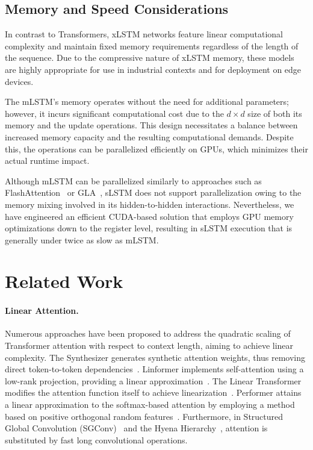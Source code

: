 \subsection{Memory and Speed Considerations}

In contrast to Transformers, xLSTM networks feature linear computational complexity and maintain fixed memory requirements regardless of the length of the sequence. Due to the compressive nature of xLSTM memory, these models are highly appropriate for use in industrial contexts and for deployment on edge devices.

The mLSTM's memory operates without the need for additional parameters; however, it incurs significant computational cost due to the $d \times d$ size of both its memory and the update operations. This design necessitates a balance between increased memory capacity and the resulting computational demands. Despite this, the operations can be parallelized efficiently on GPUs, which minimizes their actual runtime impact.

Although mLSTM can be parallelized similarly to approaches such as FlashAttention~\citep{Dao:22,Dao:23} or GLA~\citep{Yang:23arxiv}, sLSTM does not support parallelization owing to the memory mixing involved in its hidden-to-hidden interactions. Nevertheless, we have engineered an efficient CUDA-based solution that employs GPU memory optimizations down to the register level, resulting in sLSTM execution that is generally under twice as slow as mLSTM.

\section{Related Work}
\label{sec:related}

\paragraph{Linear Attention.} Numerous approaches have been proposed to address the quadratic scaling of Transformer attention with respect to context length, aiming to achieve linear complexity. The Synthesizer generates synthetic attention weights, thus removing direct token-to-token dependencies~\citep{Tay:20arxiv}. Linformer implements self-attention using a low-rank projection, providing a linear approximation~\citep{Wang:20arxiv}. The Linear Transformer modifies the attention function itself to achieve linearization~\citep{Katharopoulos:20}. Performer attains a linear approximation to the softmax-based attention by employing a method based on positive orthogonal random features~\citep{Choromanski:21}. Furthermore, in Structured Global Convolution (SGConv)~\citep{Li:22} and the Hyena Hierarchy~\citep{Poli:23}, attention is substituted by fast long convolutional operations.

